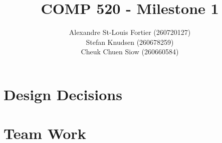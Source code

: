 \documentclass{article}
\begin{document}
\pagestyle{empty}

\title{COMP 520 - Milestone 1}
\author{
Alexandre St-Louis Fortier (260720127)\\
Stefan Knudsen (260678259)\\
Cheuk Chuen Siow (260660584)}
\maketitle

\section*{Design Decisions}

\section*{Team Work}
\end{document}
